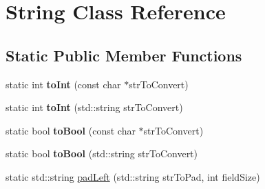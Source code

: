 \hypertarget{classString}{
\section{\-String \-Class \-Reference}
\label{classString}
}
\subsection*{\-Static \-Public \-Member \-Functions}
\begin{DoxyCompactItemize}
\item 
\hypertarget{classString_a36cf94cf05d8a38200440ee47bb36230}{
static int {\bfseries to\-Int} (const char $\ast$str\-To\-Convert)}
\label{classString_a36cf94cf05d8a38200440ee47bb36230}

\item 
\hypertarget{classString_a7b3742204bde23b66ab9f3f14376d729}{
static int {\bfseries to\-Int} (std\-::string str\-To\-Convert)}
\label{classString_a7b3742204bde23b66ab9f3f14376d729}

\item 
\hypertarget{classString_a0613bdae452b95755890c6db97ef63cf}{
static bool {\bfseries to\-Bool} (const char $\ast$str\-To\-Convert)}
\label{classString_a0613bdae452b95755890c6db97ef63cf}

\item 
\hypertarget{classString_a24ad14b55ef382e1e070592461099f48}{
static bool {\bfseries to\-Bool} (std\-::string str\-To\-Convert)}
\label{classString_a24ad14b55ef382e1e070592461099f48}

\item 
static std\-::string \hyperlink{classString_abf4e2526abbf391636a4eae820d091c7}{pad\-Left} (std\-::string str\-To\-Pad, int field\-Size)
\end{DoxyCompactItemize}


